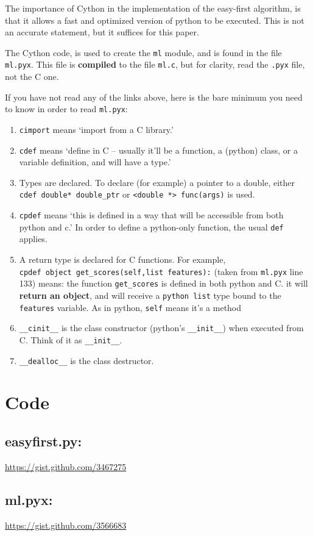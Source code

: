 \documentclass[11pt]{article}
\begin{document}
    The importance of Cython in the implementation of the easy-first
    algorithm, is that it allows a fast and optimized version of
    python to be executed. This is not an accurate statement, but it
    suffices for this paper.

    The Cython code, is used to create the \texttt{ml} module, and is found
    in the file \texttt{ml.pyx}. This file is \textbf{compiled} to the file \texttt{ml.c},
    but for clarity, read the \texttt{.pyx} file, not the C one.

    If you have not read any of the links above, here is the bare
    minimum you need to know in order to read \texttt{ml.pyx}: 
\begin{enumerate}
\item \texttt{cimport} means `import from a C library.'
\item \texttt{cdef} means `define in C -- usually it'll be a function, a
       (python) class, or a variable definition, and will have a type.'
\item Types are declared. To declare (for example) a pointer to a
       double, either \texttt{cdef double* double\_ptr} or \texttt{<double *>        func(args)} is used.
\item \texttt{cpdef} means `this is defined in a way that will be accessible
       from both python and c.' In order to define a python-only
       function, the usual \texttt{def} applies.
\item A return type is declared for C functions. For example, \\
\texttt{cpdef object get\_scores(self,list features):} (taken from \texttt{ml.pyx} line 133) means: the
       function \texttt{get\_scores} is defined in both python and C. it will
       \textbf{return an object}, and will receive a \texttt{python list} type bound
       to the \texttt{features} variable. As in python, \texttt{self} means it's a method
\item \texttt{\_\_cinit\_\_} is the class constructor (python's \texttt{\_\_init\_\_}) when
       executed from C. Think of it as \texttt{\_\_init\_\_}.
\item \texttt{\_\_dealloc\_\_} is the class destructor.
\end{enumerate}
       
    
\section{Code}
\label{sec-9}
\subsection{\label{easyfirst.py}easyfirst.py:}
\label{sec-9-1}

\href{https://gist.github.com/3467275}{https://gist.github.com/3467275}
\subsection{\label{ml.pyx}ml.pyx:}
\label{sec-9-2}

\href{https://gist.github.com/3566683}{https://gist.github.com/3566683}
\end{document}
